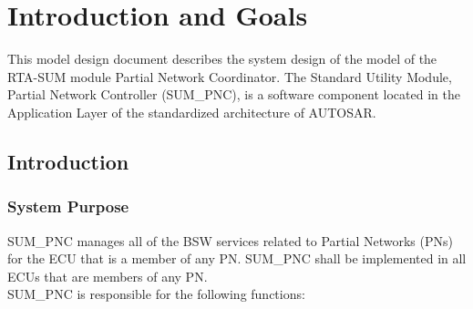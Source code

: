 \chapter{Introduction and Goals}
This model design document describes the system design of the model of the RTA-SUM module Partial Network Coordinator. The Standard Utility Module, Partial Network Controller (SUM\_PNC), is a software component located in the Application Layer of the standardized architecture of AUTOSAR.

\section{Introduction}

\subsection{System Purpose}
SUM\_PNC manages all of the BSW services related to Partial Networks (PNs) for the ECU that is a member of any PN. SUM\_PNC shall be implemented in all ECUs that are members of any PN.
\\
SUM\_PNC is responsible for the following functions: 

